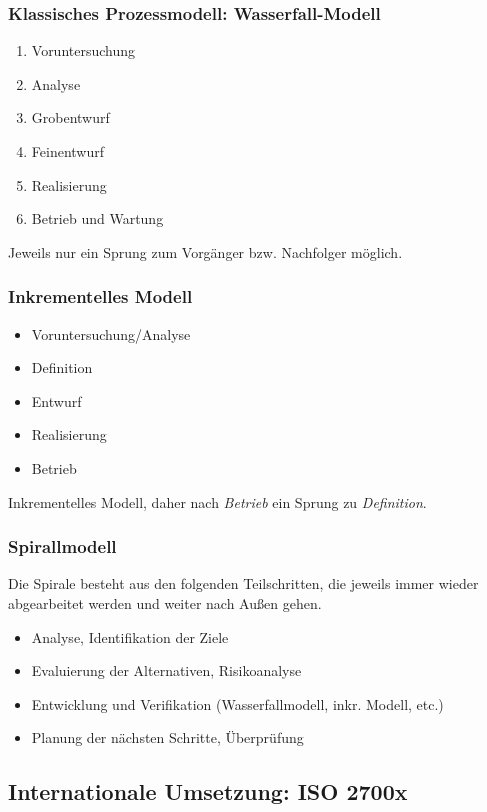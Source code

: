 \subsubsection{Klassisches Prozessmodell: Wasserfall-Modell}
\begin{enumerate}
	\item Voruntersuchung
	\item Analyse
	\item Grobentwurf
	\item Feinentwurf
	\item Realisierung
	\item Betrieb und Wartung
\end{enumerate}
Jeweils nur ein Sprung zum Vorgänger bzw. Nachfolger möglich.

\subsubsection{Inkrementelles Modell}
\begin{itemize}
	\item Voruntersuchung/Analyse
	\item Definition
	\item Entwurf
	\item Realisierung
	\item Betrieb
\end{itemize}
Inkrementelles Modell, daher nach \textit{Betrieb} ein Sprung zu \textit{Definition}.

\subsubsection{Spirallmodell}
Die Spirale besteht aus den folgenden Teilschritten, die jeweils immer wieder abgearbeitet werden und weiter nach Außen gehen.
\begin{itemize}
	\item Analyse, Identifikation der Ziele
	\item Evaluierung der Alternativen, Risikoanalyse
	\item Entwicklung und Verifikation (Wasserfallmodell, inkr. Modell, etc.)
	\item Planung der nächsten Schritte, Überprüfung
\end{itemize}

\subsection{Internationale Umsetzung: ISO 2700x}

